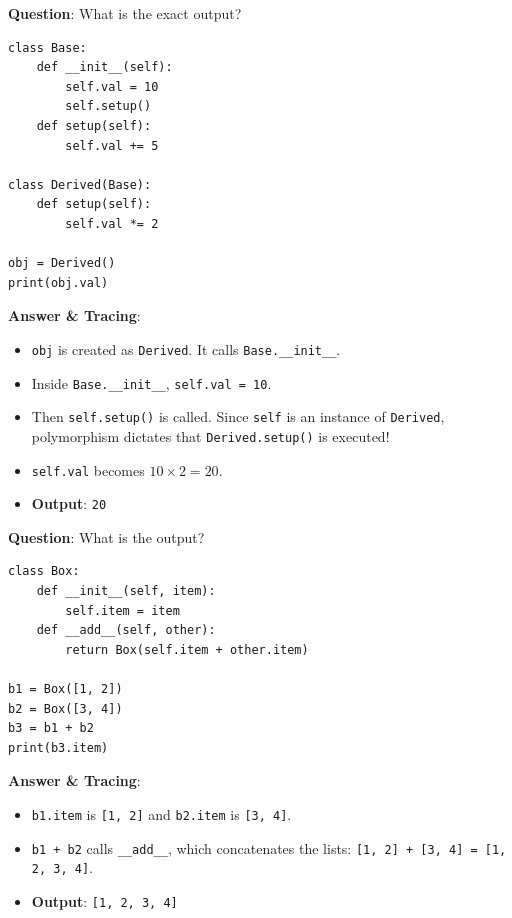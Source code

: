 \begin{outputprediction}
\textbf{Question}: What is the exact output?
\begin{lstlisting}[language=Python3]
class Base:
    def __init__(self):
        self.val = 10
        self.setup()
    def setup(self):
        self.val += 5

class Derived(Base):
    def setup(self):
        self.val *= 2

obj = Derived()
print(obj.val)
\end{lstlisting}
\textbf{Answer \& Tracing}:
\begin{itemize}
    \item \texttt{obj} is created as \texttt{Derived}. It calls \texttt{Base.\_\_init\_\_}.
    \item Inside \texttt{Base.\_\_init\_\_}, \texttt{self.val = 10}.
    \item Then \texttt{self.setup()} is called. Since \texttt{self} is an instance of \texttt{Derived}, polymorphism dictates that \texttt{Derived.setup()} is executed!
    \item \texttt{self.val} becomes $10 \times 2 = 20$.
    \item \textbf{Output}: \texttt{20}
\end{itemize}
\end{outputprediction}

\begin{outputprediction}
\textbf{Question}: What is the output?
\begin{lstlisting}[language=Python3]
class Box:
    def __init__(self, item):
        self.item = item
    def __add__(self, other):
        return Box(self.item + other.item)

b1 = Box([1, 2])
b2 = Box([3, 4])
b3 = b1 + b2
print(b3.item)
\end{lstlisting}
\textbf{Answer \& Tracing}:
\begin{itemize}
    \item \texttt{b1.item} is \texttt{[1, 2]} and \texttt{b2.item} is \texttt{[3, 4]}.
    \item \texttt{b1 + b2} calls \texttt{\_\_add\_\_}, which concatenates the lists: \texttt{[1, 2] + [3, 4] = [1, 2, 3, 4]}.
    \item \textbf{Output}: \texttt{[1, 2, 3, 4]}
\end{itemize}
\end{outputprediction}

